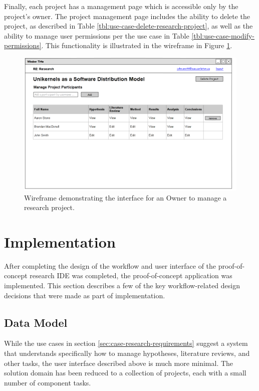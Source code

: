 \documentclass[document.tex]{subfiles}
\begin{document}
Finally, each project has a management page which is accessible only by the project's owner.
The project management page includes the ability to delete the project, as described in Table \ref{tbl:use-case-delete-research-project}, as well as the ability to manage user permissions per the use case in Table \ref{tbl:use-case-modify-permissions}.
This functionality is illustrated in the wireframe in Figure \ref{fig:case-research-design-manage-project}.

\begin{figure}[!ht]
\centering \includegraphics[width=5.5in]{./img/case-study-research-railgun/mockup-manage-project}
\caption{Wireframe demonstrating the interface for an Owner to manage a research project.}
\label{fig:case-research-design-manage-project}
\end{figure}


\FloatBarrier

\section {Implementation}

After completing the design of the workflow and user interface of the proof-of-concept research IDE was completed, the proof-of-concept application was implemented. This section describes a few of the key workflow-related design decisions that were made as part of implementation.


\subsection {Data Model}

While the use cases in section \ref{sec:case-research-requirements} suggest a system that understands specifically how to manage hypotheses, literature reviews, and other tasks, the user interface described above is much more minimal. The solution domain has been reduced to a collection of projects, each with a small number of component tasks.
\end{document}
